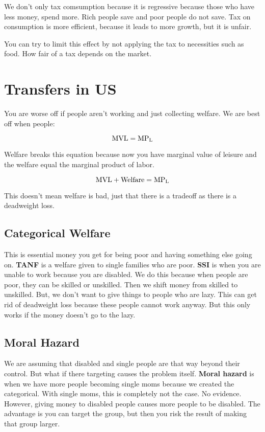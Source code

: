 \documentclass{article}
\begin{document}
We don't only tax comsumption because it is regressive because those who have
less money, spend more. Rich people save and poor people do not save. Tax on
consumption is more efficient, because it leads to more growth, but it is
unfair.

You can try to limit this effect by not applying the tax to necessities such as
food. How fair of a tax depends on the market. 

\section{ Transfers in US }

You are worse off if people aren't working and just collecting welfare. We are
best off when people:

$$ \rm{MVL} = \rm{MP_{L}} $$

Welfare breaks this equation because now you have marginal value of leisure and
the welfare equal the marginal product of labor. 

$$ \rm{MVL} + \rm{Welfare} = \rm{MP_{L}} $$

This doesn't mean welfare is bad, just that there is a tradeoff as there is a
deadweight loss. 

\subsection{ Categorical Welfare }

This is essential money you get for being poor and having something else going
on. \textbf{TANF} is a welfare given to single families who are poor.
\textbf{SSI} is when you are unable to work because you are disabled. We do this
because when people are poor, they can be skilled or unskilled. Then we shift
money from skilled to unskilled. But, we don't want to give things to people who
are lazy. This can get rid of deadweight loss because these people cannot work
anyway. But this only works if the money doesn't go to the lazy.

\subsection{ Moral Hazard }

We are assuming that disabled and single people are that way beyond their
control. But what if there targeting causes the problem itself. \textbf{Moral
hazard} is when we have more people becoming single moms because we created the
categorical. With single moms, this is completely not the case. No evidence.
However, giving money to disabled people causes more people to be disabled.
The advantage is you can target the group, but then you risk the result of
making that group larger.
\end{document}
